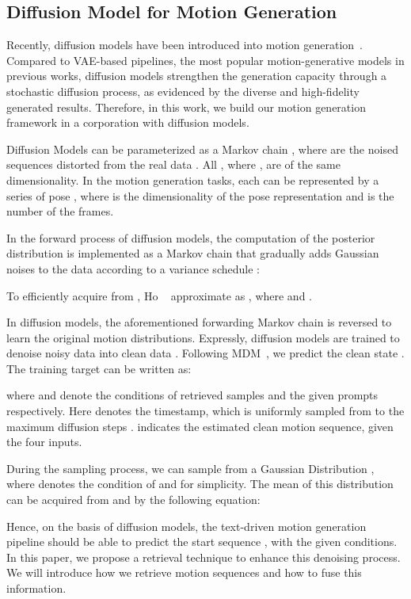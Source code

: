 \documentclass[10pt,twocolumn,letterpaper]{article}
\begin{document}
\subsection{Diffusion Model for Motion Generation}
\label{sec:mdm}




Recently, diffusion models have been introduced into motion generation~\cite{zhang2022motiondiffuse, tevet2022human}. Compared to VAE-based pipelines, the most popular motion-generative models in previous works, diffusion models strengthen the generation capacity through a stochastic diffusion process, as evidenced by the diverse and high-fidelity generated results. Therefore, in this work, we build our motion generation framework in a corporation with diffusion models.

Diffusion Models can be parameterized as a Markov chain , where  are the noised sequences distorted from the real data . All , where , are of the same dimensionality. In the motion generation tasks, each  can be represented by a series of pose , where  is the dimensionality of the pose representation and  is the number of the frames.

In the forward process of diffusion models, the computation of the posterior distribution  is implemented as a Markov chain that gradually adds Gaussian noises to the data according to a variance schedule :

\par

To efficiently acquire  from , Ho \etal~\cite{ho2020denoising} approximate  as , where  and .

In diffusion models, the aforementioned forwarding Markov chain is reversed to learn the original motion distributions. Expressly, diffusion models are trained to denoise noisy data  into clean data . Following MDM~\cite{tevet2022human}, we predict the clean state . The training target can be written as:

where  and  denote the conditions of retrieved samples and the given prompts respectively. Here  denotes the timestamp, which is uniformly sampled from  to the maximum diffusion steps .  indicates the estimated clean motion sequence, given the four inputs.

During the sampling process, we can sample  from a Gaussian Distribution , where  denotes the condition of  and  for simplicity. The mean of this distribution can be acquired from  and  by the following equation:

Hence, on the basis of diffusion models, the text-driven motion generation pipeline should be able to predict the start sequence , with the given conditions. In this paper, we propose a retrieval technique to enhance this denoising process. We will introduce how we retrieve motion sequences and how to fuse this information.
\end{document}
